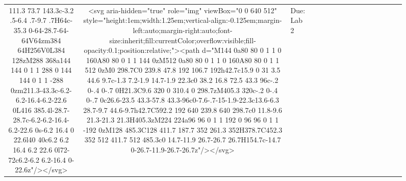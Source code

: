 \documentclass[
]{article}
\begin{document}
\begin{figure*}
\begin{longtable*}{cclllccccccccccl}
111.3 73.7 143.3c-3.2 .5-6.4 .7-9.7 .7H64c-35.3 0-64-28.7-64-64V64zm384 64H256V0L384 128zM288 368a144 144 0 1 1 288 0 144 144 0 1 1 -288 0zm211.3-43.3c-6.2-6.2-16.4-6.2-22.6 0L416 385.4l-28.7-28.7c-6.2-6.2-16.4-6.2-22.6 0s-6.2 16.4 0 22.6l40 40c6.2 6.2 16.4 6.2 22.6 0l72-72c6.2-6.2 6.2-16.4 0-22.6z"/></svg> & <svg aria-hidden="true" role="img" viewBox="0 0 640 512" style="height:1em;width:1.25em;vertical-align:-0.125em;margin-left:auto;margin-right:auto;font-size:inherit;fill:currentColor;overflow:visible;fill-opacity:0.1;position:relative;"><path d="M144 0a80 80 0 1 1 0 160A80 80 0 1 1 144 0zM512 0a80 80 0 1 1 0 160A80 80 0 1 1 512 0zM0 298.7C0 239.8 47.8 192 106.7 192h42.7c15.9 0 31 3.5 44.6 9.7c-1.3 7.2-1.9 14.7-1.9 22.3c0 38.2 16.8 72.5 43.3 96c-.2 0-.4 0-.7 0H21.3C9.6 320 0 310.4 0 298.7zM405.3 320c-.2 0-.4 0-.7 0c26.6-23.5 43.3-57.8 43.3-96c0-7.6-.7-15-1.9-22.3c13.6-6.3 28.7-9.7 44.6-9.7h42.7C592.2 192 640 239.8 640 298.7c0 11.8-9.6 21.3-21.3 21.3H405.3zM224 224a96 96 0 1 1 192 0 96 96 0 1 1 -192 0zM128 485.3C128 411.7 187.7 352 261.3 352H378.7C452.3 352 512 411.7 512 485.3c0 14.7-11.9 26.7-26.7 26.7H154.7c-14.7 0-26.7-11.9-26.7-26.7z"/></svg> & Due: Lab 2 \\ 

\end{longtable*}
\end{figure*}
\end{document}

